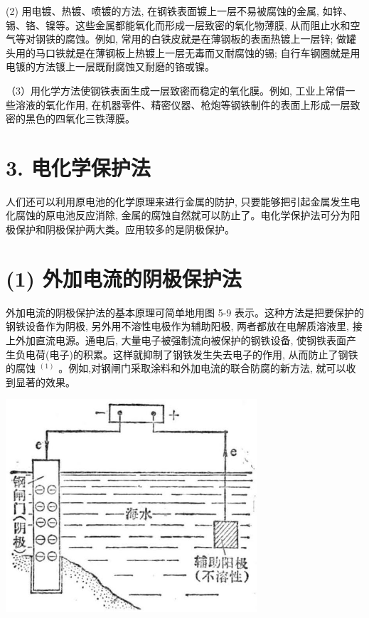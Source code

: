 \documentclass[10pt]{article}
\begin{document}
(2) 用电镀、热镀、喷镀的方法, 在钢铁表面镀上一层不易被腐蚀的金属, 如锌、锡、铬、镍等。这些金属都能氧化而形成一层致密的氧化物薄膜, 从而阻止水和空气等对钢铁的腐蚀。例如, 常用的白铁皮就是在薄钢板的表面热镀上一层锌; 做罐头用的马口铁就是在薄钢板上热镀上一层无毒而又耐腐蚀的锡; 自行车钢圈就是用电镀的方法镀上一层既耐腐蚀又耐磨的铬或镍。

（3）用化学方法使钢铁表面生成一层致密而稳定的氧化膜。例如, 工业上常借一些溶液的氧化作用, 在机器零件、精密仪器、枪炮等钢铁制件的表面上形成一层致密的黑色的四氧化三铁薄膜。

\section*{3. 电化学保护法}

人们还可以利用原电池的化学原理来进行金属的防护, 只要能够把引起金属发生电化腐蚀的原电池反应消除, 金属的腐蚀自然就可以防止了。电化学保护法可分为阳极保护和阴极保护两大类。应用较多的是阴极保护。

\section*{(1) 外加电流的阴极保护法}

外加电流的阴极保护法的基本原理可简单地用图 5-9 表示。这种方法是把要保护的钢铁设备作为阴极, 另外用不溶性电极作为辅助阳极, 两者都放在电解质溶液里, 接上外加直流电源。通电后, 大量电子被强制流向被保护的钢铁设备, 使钢铁表面产生负电荷(电子)的积累。这样就抑制了钢铁发生失去电子的作用, 从而防止了钢铁的腐蚀 \({}^{\left( 1\right) }\) 。例如,对钢闸门采取涂料和外加电流的联合防腐的新方法, 就可以收到显著的效果。

\begin{center}
\includegraphics[max width=0.7\textwidth]{images/01912d13-9986-7822-a012-3f3f7be99dcb_164_465579.jpg}
\end{center}
\end{document}
